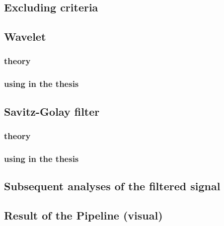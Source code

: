 \subsection{Excluding criteria}
\subsection{Wavelet}
\subsubsection{theory}
\subsubsection{using in the thesis}
\subsection{Savitz-Golay filter}
\subsubsection{theory}
\subsubsection{using in the thesis}
\subsection{Subsequent analyses of the filtered signal}
\subsection{Result of the Pipeline (visual)}